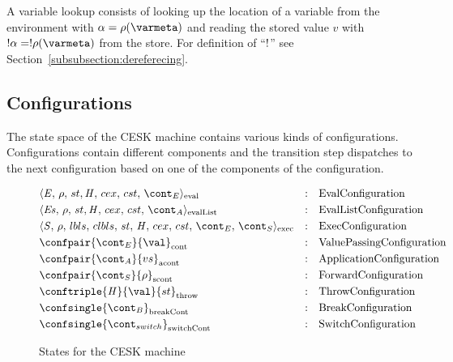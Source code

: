 \documentclass[a4paper,oneside]{article}
\begin{document}
A variable lookup consists of looking up the location of a variable from the environment with $\loc = \env(\varmeta)$ and reading the stored value $v$ with $\deref{\loc} = \deref{\env(\varmeta)}$ from the store.
For definition of ``$\deref$'' see Section~\ref{subsubsection:dereferecing}.


\subsection{Configurations}
\label{subsec:cesk-configs}

The state space of the CESK machine contains various kinds of configurations.
Configurations contain different components and the transition step dispatches to the next configuration based on one of the components of the configuration.
%
\newcommand{\breakconf}[1]{\confsingle{#1}_{\mathrm{breakCont}}}
\newcommand{\switchconf}[1]{\confsingle{#1}_{\mathrm{switchCont}}}
\newcommand{\contconf}[2]{\confpair{#1}{#2}_{\mathrm{cont}}}
\newcommand{\scontconf}[2]{\confpair{#1}{#2}_{\mathrm{scont}}}
\newcommand{\acontconf}[2]{\confpair{#1}{#2}_{\mathrm{acont}}}
\newcommand{\throwconf}[3]{\conftriple{#1}{#2}{#3}_{\mathrm{throw}}}
\newcommand{\evallistconf}[6]{\langle{#1},\,{#2},\,{#3},\handler,\,{#4},\,{#5},\,{#6}\rangle_{\mathrm{evalList}}}
\newcommand{\evalconf}[6]{\langle{#1},\,{#2},\,{#3},\handler,\,{#4},\,{#5},\,{#6}\rangle_{\mathrm{eval}}}
\newcommand{\execconf}[9]{\langle{#1},\,{#2},\,{#3},\,{#4},\,\strace,\,{#5},\,{#6},\,{#7},\,{#8},\,{#9}\rangle_{\mathrm{exec}}}

\begin{figure}[Htp]
  \begin{align}
    &\evalconf{\expr}{\env}{st}{cex}{cst}{\econt} & :\quad & \text{EvalConfiguration} \label{config:eval}\\
    &\evallistconf{\exprs}{\env}{st}{cex}{cst}{\acont} & :\quad & \text{EvalListConfiguration} \label{config:evallist}\\
    &\execconf{\stmt}{\env}{\lbls}{\clbls}{\handler}{\cex}{\cstrace}{\econt}{\scont}  & :\quad & \text{ExecConfiguration} \label{config:exec}\\
    &\contconf{\econt}{\val} & :\quad & \text{ValuePassingConfiguration} \label{config:econt}\\
    &\acontconf{\acont}{\vals} & :\quad & \text{ApplicationConfiguration} \label{config:acont}\\
    &\scontconf{\scont}{\env} & :\quad & \text{ForwardConfiguration} \label{config:scont}\\
    &\throwconf{\handler}{\val}{\strace} & :\quad & \text{ThrowConfiguration} \label{config:throw}\\
    &\breakconf{\bcont} & :\quad & \text{BreakConfiguration} \label{config:bcont}\\
    &\switchconf{\switchcont} & :\quad &
    \text{SwitchConfiguration}
    \label{config:switchcont}
  \end{align}
  \caption{States for the CESK machine}
\end{figure}
\end{document}

